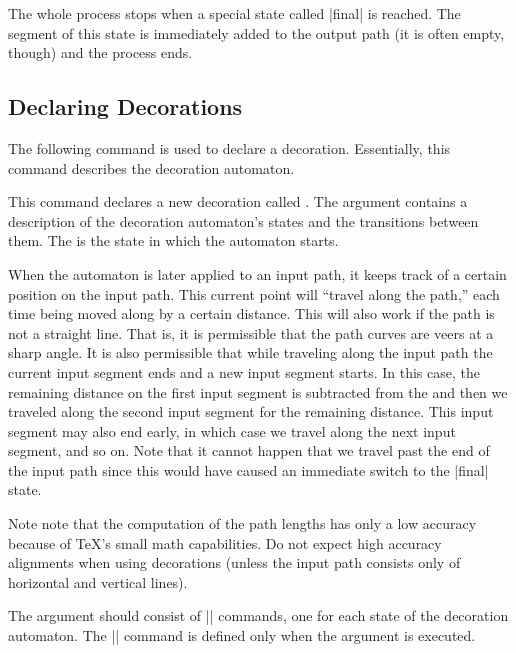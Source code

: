 The whole process stops when a special state called |final| is
reached. The segment of this state is immediately added to the output
path (it is often empty, though) and the process ends.




\subsection{Declaring Decorations}

The following command is used to declare a decoration. Essentially,
this command describes the decoration automaton.


\begin{command}{\pgfdeclaredecoration{}}
  This command declares a new decoration called . The
   argument contains a description of the decoration
  automaton's states and the transitions between them. The
   is the state in which the automaton starts.

  When the automaton is later applied to an input path, it keeps track
  of a certain position on the input path. This current point
  will ``travel along the path,'' each time being moved along by a
  certain distance. This will also work if the path is not a straight
  line. That is, it is permissible that the path curves are veers at a
  sharp angle.  It is also permissible that while traveling along the
  input path the current input segment ends and a new input segment starts. In this
  case, the remaining distance on the first input segment is subtracted
  from the  and then we traveled along the second
  input segment for the remaining distance. This input segment may also end
  early, in which case we travel along the next input segment, and so
  on. Note that it cannot happen that we travel past the end of the
  input path since this would have caused an immediate switch to
  the |final| state.

  Note note that the computation of the path lengths has only a low
  accuracy because of \TeX's small math capabilities. Do not
  expect high accuracy alignments when using decorations (unless the
  input path consists only of horizontal and vertical lines).

  The  argument should consist of |\state| commands, one
  for each state of the decoration automaton. The |\state| command is
  defined only when the  argument is executed.


\end{command}
